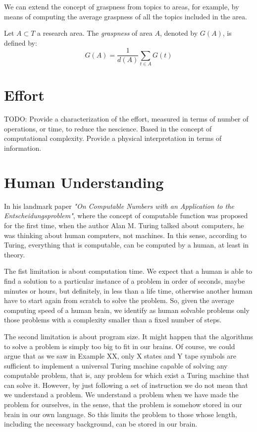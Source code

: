 We can extend the concept of graspness from topics to areas, for example, by means of computing the average graspness of all the topics included in the area.

\begin{definition}
Let $A \subset T$ a research area. The \emph{graspness} of area $A$, denoted by $G(A)$, is defined by:
\[
G(A) = \frac{1}{d(A)} \sum_{t \in A} G(t)
\]
\end{definition}

%
%
\section{Effort}

{\color{red} TODO: Provide a characterization of the effort, measured in terms of number of operations, or time, to reduce the nescience. Based in the concept of computational complexity. Provide a physical interpretation in terms of information.}

%
%
\section{Human Understanding}

In his landmark paper \emph{"On Computable Numbers with an Application to the Entscheidungsproblem"}, where the concept of computable function was proposed for the first time, when the author Alan M. Turing talked about computers, he was thinking about human computers, not machines. In this sense, according to Turing, everything that is computable, can be computed by a human, at least in theory.

The fist limitation is about computation time. We expect that a human is able to find a solution to a particular instance of a problem in order of seconds, maybe minutes or hours, but definitely, in less than a life time, otherwise another human have to start again from scratch to solve the problem. So, given the average computing speed of a human brain, we identify as human solvable problems only those problems with a complexity smaller than a fixed number of steps.

The second limitation is about program size. It might happen that the algorithms to solve a problem is simply too big to fit in our brains. Of course, we could argue that {\color{red} as we saw in Example XX, only X states and Y tape symbols} are sufficient to implement a universal Turing machine capable of solving any computable problem, that is, any problem for which exist a Turing machine that can solve it. However, by just following a set of instruction we do not mean that we understand a problem. We understand a problem when we have made the problem for ourselves, in the sense, that the problem is somehow stored in our brain in our own language. So this limits the problem to those whose length, including the necessary background, can be stored in our brain.

